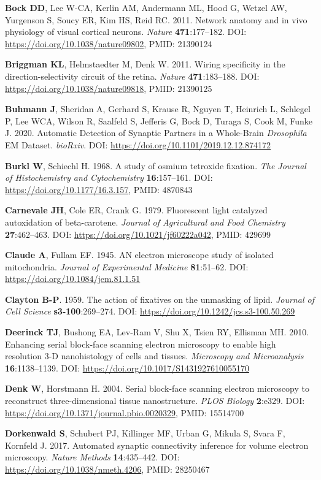 \documentclass{article}
\newenvironment{reflist}{\par\small\setlength{\parindent}{0pt}\everypar{\hangindent=2.2em\hangafter=1}}{\par}
\begin{document}
\begin{reflist}
\textbf{Bock DD}, Lee W-CA, Kerlin AM, Andermann ML, Hood G, Wetzel AW, Yurgenson S, Soucy ER, Kim HS, Reid RC. 2011. Network anatomy and in vivo physiology of visual cortical neurons. \emph{Nature} \textbf{471}:177–182. DOI: \url{https://doi.org/10.1038/nature09802}, PMID: 21390124

\textbf{Briggman KL}, Helmstaedter M, Denk W. 2011. Wiring specificity in the direction-selectivity circuit of the retina. \emph{Nature} \textbf{471}:183–188. DOI: \url{https://doi.org/10.1038/nature09818}, PMID: 21390125

\textbf{Buhmann J}, Sheridan A, Gerhard S, Krause R, Nguyen T, Heinrich L, Schlegel P, Lee WCA, Wilson R, Saalfeld S, Jefferis G, Bock D, Turaga S, Cook M, Funke J. 2020. Automatic Detection of Synaptic Partners in a Whole-Brain \emph{Drosophila} EM Dataset. \emph{bioRxiv}. DOI: \url{https://doi.org/10.1101/2019.12.12.874172}

\textbf{Burkl W}, Schiechl H. 1968. A study of osmium tetroxide fixation. \emph{The Journal of Histochemistry and Cytochemistry} \textbf{16}:157–161. DOI: \url{https://doi.org/10.1177/16.3.157}, PMID: 4870843

\textbf{Carnevale JH}, Cole ER, Crank G. 1979. Fluorescent light catalyzed autoxidation of beta-carotene. \emph{Journal of Agricultural and Food Chemistry} \textbf{27}:462–463. DOI: \url{https://doi.org/10.1021/jf60222a042}, PMID: 429699

\textbf{Claude A}, Fullam EF. 1945. AN electron microscope study of isolated mitochondria. \emph{Journal of Experimental Medicine} \textbf{81}:51–62. DOI: \url{https://doi.org/10.1084/jem.81.1.51}

\textbf{Clayton B-P}. 1959. The action of fixatives on the unmasking of lipid. \emph{Journal of Cell Science} \textbf{s3-100}:269–274. DOI: \url{https://doi.org/10.1242/jcs.s3-100.50.269}

\textbf{Deerinck TJ}, Bushong EA, Lev-Ram V, Shu X, Tsien RY, Ellisman MH. 2010. Enhancing serial block-face scanning electron microscopy to enable high resolution 3-D nanohistology of cells and tissues. \emph{Microscopy and Microanalysis} \textbf{16}:1138–1139. DOI: \url{https://doi.org/10.1017/S1431927610055170}

\textbf{Denk W}, Horstmann H. 2004. Serial block-face scanning electron microscopy to reconstruct three-dimensional tissue nanostructure. \emph{PLOS Biology} \textbf{2}:e329. DOI: \url{https://doi.org/10.1371/journal.pbio.0020329}, PMID: 15514700

\textbf{Dorkenwald S}, Schubert PJ, Killinger MF, Urban G, Mikula S, Svara F, Kornfeld J. 2017. Automated synaptic connectivity inference for volume electron microscopy. \emph{Nature Methods} \textbf{14}:435–442. DOI: \url{https://doi.org/10.1038/nmeth.4206}, PMID: 28250467


\end{reflist}
\end{document}
